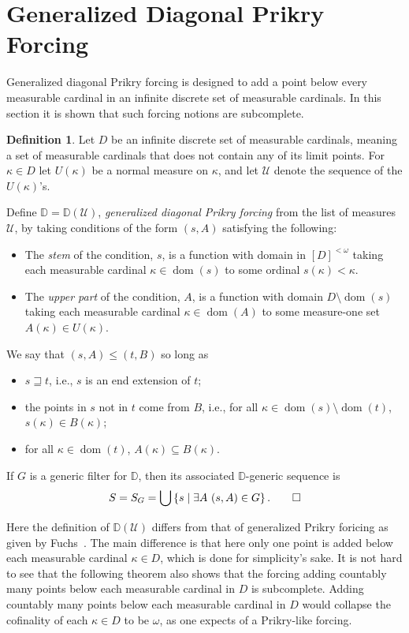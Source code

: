 \documentclass{amsart}
\theoremstyle{definition}
\newtheorem{definition}[theorem]{Definition}
\theoremstyle{remark}
\newcommand{\D}{\mathbb{D}}
\newcommand{\U}{\mathcal{U}}
\DeclareMathOperator{\dom}{dom}
\newcommand{\st}{\; | \;}
\newcommand{\set}[2]{\left\{#1\st #2 \right\}}
\begin{document}
\section{Generalized Diagonal Prikry Forcing}
\label{sec:GenDiagonalPrikryForcing}
Generalized diagonal Prikry forcing is designed to add a point below every measurable cardinal in an infinite discrete set of measurable cardinals. In this section it is shown that such forcing notions are subcomplete.
\begin{definition}
Let $D$ be an infinite discrete set of measurable cardinals, meaning a set of measurable cardinals that does not contain any of its limit points. For $\kappa \in D$ let $U(\kappa)$ be a normal measure on $\kappa$, and let $\U$ denote the sequence of the $U(\kappa)$'s.

Define $\D=\D(\U)$, \emph{generalized diagonal Prikry forcing} from the list of measures $\U$, by taking conditions of the form  
$( s, A )$ satisfying the following:
\begin{itemize}
	\item The \textit{stem} of the condition, $s$, is a function with domain in $[D]^{<\omega}$ taking each measurable cardinal $\kappa \in \dom(s)$ to some ordinal $s(\kappa) < \kappa$.
	\item The \textit{upper part} of the condition, $A$, is a function with domain $D \setminus {\dom(s)}$ taking each measurable cardinal $\kappa \in \dom(A)$ to some measure-one set $A(\kappa) \in U(\kappa)$.
\end{itemize}
We say that $( s, A ) \leq ( t, B )$ so long as 
\begin{itemize}
	\item $s \sqsupseteq t$, i.e., $s$ is an end extension of $t$;
	\item the points in $s$ not in $t$ come from $B$, i.e., for all $\kappa \in \dom(s) \setminus \dom(t)$, $s(\kappa) \in B(\kappa)$;
	\item for all $\kappa \in \dom(t)$, $A(\kappa) \subseteq B(\kappa)$.
\end{itemize}
If $G$ is a generic filter for $\D$, then its associated $\D$-generic sequence is \[S = S_G = \bigcup \set{ s }{ \exists A \ ( s, A ) \in G }.\qedhere\]
\end{definition}

Here the definition of $\D(\U)$ differs from that of generalized Prikry foricing as given by Fuchs~\cite{Fuchs:2005kx}. The main difference is that here only one point is added below each measurable cardinal $\kappa \in D$, which is done for simplicity's sake. It is not hard to see that the following theorem also shows that the forcing adding countably many points below each measurable cardinal in $D$ is subcomplete. Adding countably many points below each measurable cardinal in $D$ would collapse the cofinality of each $\kappa \in D$ to be $\omega$, as one expects of a Prikry-like forcing. %
\end{document}
